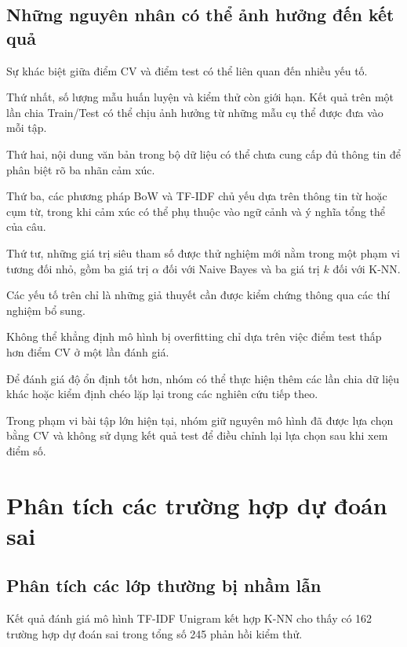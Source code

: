 \subsection{Những nguyên nhân có thể ảnh hưởng đến kết quả}

Sự khác biệt giữa điểm CV và điểm test có thể
liên quan đến nhiều yếu tố.

Thứ nhất, số lượng mẫu huấn luyện và kiểm thử
còn giới hạn. Kết quả trên một lần chia
Train/Test có thể chịu ảnh hưởng từ những
mẫu cụ thể được đưa vào mỗi tập.

Thứ hai, nội dung văn bản trong bộ dữ liệu
có thể chưa cung cấp đủ thông tin để phân
biệt rõ ba nhãn cảm xúc.

Thứ ba, các phương pháp BoW và TF-IDF chủ yếu
dựa trên thông tin từ hoặc cụm từ, trong khi
cảm xúc có thể phụ thuộc vào ngữ cảnh
và ý nghĩa tổng thể của câu.

Thứ tư, những giá trị siêu tham số được thử
nghiệm mới nằm trong một phạm vi tương đối
nhỏ, gồm ba giá trị $\alpha$ đối với Naive Bayes
và ba giá trị $k$ đối với K-NN.

Các yếu tố trên chỉ là những giả thuyết
cần được kiểm chứng thông qua các thí nghiệm
bổ sung.

Không thể khẳng định mô hình bị overfitting
chỉ dựa trên việc điểm test thấp hơn
điểm CV ở một lần đánh giá.

Để đánh giá độ ổn định tốt hơn, nhóm có thể
thực hiện thêm các lần chia dữ liệu khác
hoặc kiểm định chéo lặp lại trong các
nghiên cứu tiếp theo.

Trong phạm vi bài tập lớn hiện tại, nhóm
giữ nguyên mô hình đã được lựa chọn bằng CV
và không sử dụng kết quả test để điều chỉnh
lại lựa chọn sau khi xem điểm số.



\section{Phân tích các trường hợp dự đoán sai}

\subsection{Phân tích các lớp thường bị nhầm lẫn}

Kết quả đánh giá mô hình TF-IDF Unigram
kết hợp K-NN cho thấy có 162 trường hợp
dự đoán sai trong tổng số 245 phản hồi
kiểm thử.

